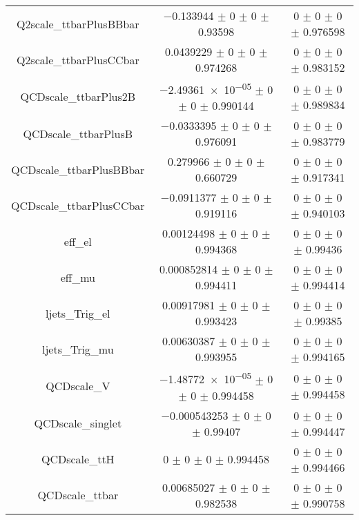 \begin{table}
\begin{tabular}{ccc}
Q2scale\_ttbarPlusBBbar & \num{-0.133944} $\pm$ \num{0} $\pm$ \num{0} $\pm$ \num{0.93598} & \num{0} $\pm$ \num{0} $\pm$ \num{0} $\pm$ \num{0.976598}\\
Q2scale\_ttbarPlusCCbar & \num{0.0439229} $\pm$ \num{0} $\pm$ \num{0} $\pm$ \num{0.974268} & \num{0} $\pm$ \num{0} $\pm$ \num{0} $\pm$ \num{0.983152}\\
QCDscale\_ttbarPlus2B & \num{-2.49361e-05} $\pm$ \num{0} $\pm$ \num{0} $\pm$ \num{0.990144} & \num{0} $\pm$ \num{0} $\pm$ \num{0} $\pm$ \num{0.989834}\\
QCDscale\_ttbarPlusB & \num{-0.0333395} $\pm$ \num{0} $\pm$ \num{0} $\pm$ \num{0.976091} & \num{0} $\pm$ \num{0} $\pm$ \num{0} $\pm$ \num{0.983779}\\
QCDscale\_ttbarPlusBBbar & \num{0.279966} $\pm$ \num{0} $\pm$ \num{0} $\pm$ \num{0.660729} & \num{0} $\pm$ \num{0} $\pm$ \num{0} $\pm$ \num{0.917341}\\
QCDscale\_ttbarPlusCCbar & \num{-0.0911377} $\pm$ \num{0} $\pm$ \num{0} $\pm$ \num{0.919116} & \num{0} $\pm$ \num{0} $\pm$ \num{0} $\pm$ \num{0.940103}\\
eff\_el & \num{0.00124498} $\pm$ \num{0} $\pm$ \num{0} $\pm$ \num{0.994368} & \num{0} $\pm$ \num{0} $\pm$ \num{0} $\pm$ \num{0.99436}\\
eff\_mu & \num{0.000852814} $\pm$ \num{0} $\pm$ \num{0} $\pm$ \num{0.994411} & \num{0} $\pm$ \num{0} $\pm$ \num{0} $\pm$ \num{0.994414}\\
ljets\_Trig\_el & \num{0.00917981} $\pm$ \num{0} $\pm$ \num{0} $\pm$ \num{0.993423} & \num{0} $\pm$ \num{0} $\pm$ \num{0} $\pm$ \num{0.99385}\\
ljets\_Trig\_mu & \num{0.00630387} $\pm$ \num{0} $\pm$ \num{0} $\pm$ \num{0.993955} & \num{0} $\pm$ \num{0} $\pm$ \num{0} $\pm$ \num{0.994165}\\
QCDscale\_V & \num{-1.48772e-05} $\pm$ \num{0} $\pm$ \num{0} $\pm$ \num{0.994458} & \num{0} $\pm$ \num{0} $\pm$ \num{0} $\pm$ \num{0.994458}\\
QCDscale\_singlet & \num{-0.000543253} $\pm$ \num{0} $\pm$ \num{0} $\pm$ \num{0.99407} & \num{0} $\pm$ \num{0} $\pm$ \num{0} $\pm$ \num{0.994447}\\
QCDscale\_ttH & \num{0} $\pm$ \num{0} $\pm$ \num{0} $\pm$ \num{0.994458} & \num{0} $\pm$ \num{0} $\pm$ \num{0} $\pm$ \num{0.994466}\\
QCDscale\_ttbar & \num{0.00685027} $\pm$ \num{0} $\pm$ \num{0} $\pm$ \num{0.982538} & \num{0} $\pm$ \num{0} $\pm$ \num{0} $\pm$ \num{0.990758}\\

\end{tabular}
\end{table}
